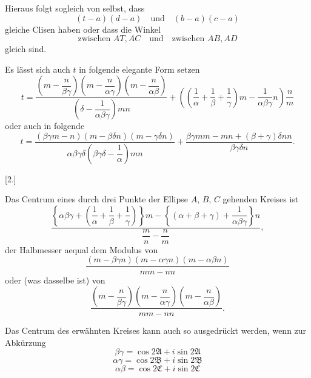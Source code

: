 
Hieraus folgt sogleich von selbst, dass
\[
(t-a)(d-a) \quad \text{und} \quad (b-a)(c-a)
\]
gleiche Clisen haben oder dass die Winkel
\[
\text{zwischen } AT, AC \quad \text{und} \quad \text{zwischen } AB, AD
\]
gleich sind.

Es lässt sich auch $t$ in folgende elegante Form setzen
\[
t = \dfrac{\left(m-\dfrac{n}{\beta\gamma}\right)
  \left(m-\dfrac{n}{\alpha\gamma}\right)
  \left(m-\dfrac{n}{\alpha\beta}\right)}
  {\left(\delta - \dfrac{1}{\alpha\beta\gamma}\right) m n}
  + \left(\left(\dfrac{1}{\alpha}+\dfrac{1}{\beta}+\dfrac{1}{\gamma}\right) m
  - \dfrac{1}{\alpha\beta\gamma} n\right) \dfrac{n}{m}
\]
oder auch in folgende
\[
t = \dfrac{(\beta\gamma m - n)(m - \beta\delta n)(m-\gamma\delta n)}
  {\alpha\beta\gamma\delta\left(\beta\gamma\delta - \dfrac{1}{\alpha}\right) m n}
  + \dfrac{\beta\gamma m m - m n + (\beta+\gamma)\delta n n}{\beta\gamma\delta n}.
\]

\begin{center}
[2.]
\end{center}

Das Centrum eines durch drei Punkte der Ellipse $A$, $B$, $C$ gehenden
Kreises ist
\[
\dfrac{\left\{\alpha\beta\gamma +
  \left(\dfrac{1}{\alpha}+\dfrac{1}{\beta}+\dfrac{1}{\gamma}\right)\right\} m
  - \left\{(\alpha+\beta+\gamma) + \dfrac{1}{\alpha\beta\gamma}\right\} n}
  {\dfrac{m}{n} - \dfrac{n}{m}},
\]
der Halbmesser aequal dem Modulus von \[
\dfrac{(m-\beta\gamma n)(m-\alpha\gamma n)(m-\alpha\beta n)}{mm - nn}
\]
oder (was dasselbe ist) von
\[
\dfrac{\left(m-\dfrac{n}{\beta\gamma}\right)\left(m-\dfrac{n}{\alpha\gamma}\right)
  \left(m-\dfrac{n}{\alpha\beta}\right)}{mm-nn}.
\]

Das Centrum des erwähnten Kreises kann auch so ausgedrückt werden, wenn zur
Abkürzung
\[
\beta\gamma = \cos 2\mathfrak{A} + i\sin 2\mathfrak{A}
\]
\[
\alpha\gamma = \cos 2\mathfrak{B} + i\sin 2\mathfrak{B}
\]
\[
\alpha\beta = \cos 2\mathfrak{C} + i\sin 2\mathfrak{C}
\]%
